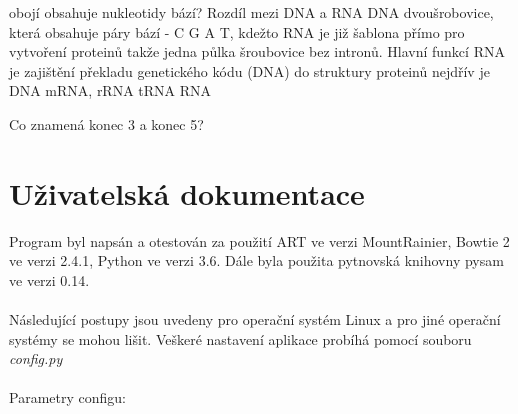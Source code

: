 \documentclass[czech,DP]{thesiskiv}
\numberwithin{equation}{section}
\begin{document}
obojí obsahuje nukleotidy bází? 
Rozdíl mezi DNA a RNA
DNA dvoušrobovice, která obsahuje páry bází - C G A T, kdežto RNA je již šablona přímo pro vytvoření proteinů takže jedna půlka šroubovice bez intronů. 
Hlavní funkcí RNA je zajištění překladu genetického kódu (DNA) do struktury proteinů
nejdřív je DNA  mRNA, rRNA tRNA RNA

Co znamená konec 3 a konec 5? 

% 
%
\nocite{*}

{\raggedright\small

}


\appendix
\chapter{Uživatelská dokumentace}
Program byl napsán a otestován za použití ART ve verzi MountRainier, Bowtie 2 ve verzi 2.4.1, Python ve verzi 3.6. Dále byla použita pytnovská knihovny pysam ve verzi 0.14. 
\\
\\
Následující postupy jsou uvedeny pro operační systém Linux a pro jiné operační systémy se mohou lišit. Veškeré nastavení aplikace probíhá pomocí souboru \textit{config.py}
\\
\\
\noindent
Parametry configu:
\end{document}
